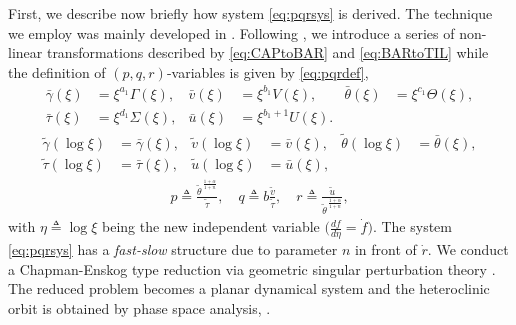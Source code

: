 \documentclass[graybox]{svmult}
\def\bg{{\bar{\gamma}}}
\def\bv{{\bar{v}}}
\def\bth{{\bar{\theta}}}
\def\bs{{\bar{\tau}}}
\def\bu{{\bar{u}}}
\def\tg{{\tilde{\gamma}}}
\def\tv{{\tilde{v}}}
\def\tth{{\tilde{\theta}}}
\def\ts{{\tilde{\tau}}}
\def\tu{{\tilde{u}}}
\begin{document}
First, we describe now briefly how system \eqref{eq:pqrsys} is derived.  The technique we employ was mainly developed in  \cite{KOT14}. Following \cite{KOT14,LT16,LT16_2},  we introduce a series of non-linear transformations described by  \eqref{eq:CAPtoBAR} and \eqref{eq:BARtoTIL} while the definition of $(p,q,r)$-variables is given by \eqref{eq:pqrdef}, 
\begin{equation} \label{eq:CAPtoBAR}
\begin{aligned}
 \bg(\xi)&=\xi^{a_1}\Gamma(\xi), &
 \bv(\xi)&=\xi^{b_1}V(\xi), &
 \bth(\xi)&=\xi^{c_1}\Theta(\xi), \\
 \bs(\xi)&=\xi^{d_1}\Sigma(\xi), &
 \bu(\xi)&=\xi^{b_1+1}U(\xi).
\end{aligned}
\end{equation}
\begin{equation} \label{eq:BARtoTIL}
\begin{aligned}
 \tg(\log\xi)&=\bg(\xi), &
 \tv(\log\xi)&=\bv(\xi), &
 \tth(\log\xi)&=\bth(\xi), \\
 \ts(\log\xi)&=\bs(\xi), &
 \tu(\log\xi)&=\bu(\xi), 
\end{aligned}
\end{equation}
\begin{equation}\label{eq:pqrdef}
 \begin{aligned}
  p \triangleq \frac{\tth^{\,\frac{1+\alpha}{1+n}}}{\ts}, \quad q \triangleq b \frac{\tv}{\ts},  \quad r \triangleq \frac{\tu}{\tth^{\,\frac{1+\alpha}{1+n}}},
 \end{aligned}
\end{equation}
with $\eta\triangleq \log\xi$ being the new independent variable $\Big(\frac{df}{d\eta}=\dot{f}\Big)$. 
The system \eqref{eq:pqrsys} has a {\it fast-slow} structure due to parameter $n$ in front of $\dot{r}$. We conduct a Chapman-Enskog type reduction via geometric singular perturbation theory \cite{fenichel_geometric_1979, KUEHN_2015}. The reduced problem becomes a planar dynamical system and  the heteroclinic orbit is obtained by phase space analysis, \cite{LT16_2}. 
\end{document}
